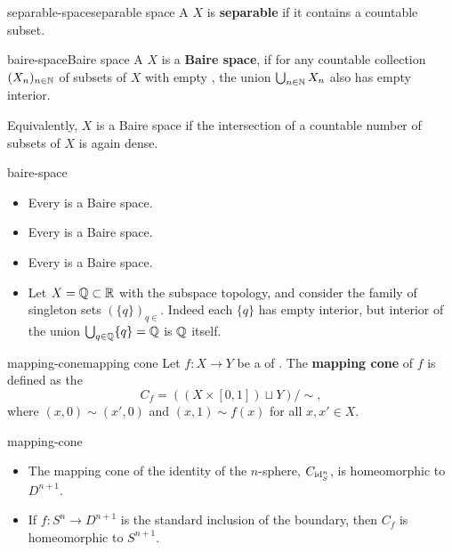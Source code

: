 \begin{topic}{separable-space}{separable space}
    A  $X$ is \textbf{separable} if it contains a countable  subset.
\end{topic}

\begin{topic}{baire-space}{Baire space}
    A  $X$ is a \textbf{Baire space}, if for any countable collection $(X_n)_{n \in \mathbb{N}}$ of subsets of $X$ with empty , the union $\bigcup_{n \in \mathbb{N}} X_n$ also has empty interior.
    
    Equivalently, $X$ is a Baire space if the intersection of a countable number of  subsets of $X$ is again dense.
\end{topic}

\begin{example}{baire-space}
    \begin{itemize}
        \item Every   is a Baire space.
        \item Every  is a Baire space.
        \item Every  is a Baire space.
        \item Let $X = \mathbb{Q} \subset \mathbb{R}$ with the subspace topology, and consider the family of singleton sets $(\{ q \})_{q \in }$. Indeed each $\{ q \}$ has empty interior, but interior of the union $\bigcup_{q \in \mathbb{Q}} \{ q \} = \mathbb{Q}$ is $\mathbb{Q}$ itself.
    \end{itemize}
\end{example}

\begin{topic}{mapping-cone}{mapping cone}
    Let $f : X \to Y$ be a  of . The \textbf{mapping cone} of $f$ is defined as the 
    \[ C_f = ( (X \times [0, 1]) \sqcup Y ) / \sim{} , \]
    where $(x, 0) \sim (x', 0)$ and $(x, 1) \sim f(x)$ for all $x, x' \in X$.
\end{topic}

\begin{example}{mapping-cone}
    \begin{itemize}
        \item The mapping cone of the identity of the $n$-sphere, $C_{\textup{id}_S^{n}}$, is homeomorphic to $D^{n + 1}$.
        \item If $f : S^n \to D^{n + 1}$ is the standard inclusion of the boundary, then $C_f$ is homeomorphic to $S^{n + 1}$.
    \end{itemize}
\end{example}


